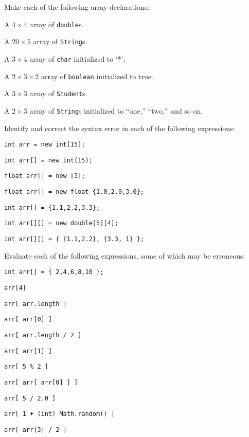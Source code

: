 \begin{EXRtwo}
\baselineskip=11pt\item  Make each of the following array declarations:
\begin{EXRtwoLL}
\item  A $4 \times 4$ array of {\tt double}s.
\item  A $20 \times 5$ array of {\tt String}s.
\item  A $3 \times 4$ array of {\tt char} initialized to `*';
\item  A $2 \times 3 \times 2$ array of {\tt boolean} initialized to true.
\item  A $3 \times 3$  array of {\tt Student}s.
\item  A $2 \times 3$  array of {\tt String}s initialized to ``one,'' ``two,''
and so on.
\end{EXRtwoLL}

\item Identify and correct the syntax error in
each of the following expressions:
\begin{EXRtwoLL}
\item  \verb|int arr = new int[15];|
\item  \verb|int arr[] = new int(15);|
\item  \verb|float arr[] = new [3];|
\item  \verb|float arr[] = new float {1.0,2.0,3.0};|
\item  \verb|int arr[] = {1.1,2.2,3.3};|
\item  \verb|int arr[][] = new double[5][4];|
\item  \verb|int arr[][] = { {1.1,2.2}, {3.3, 1} };|
\end{EXRtwoLL}


\item  Evaluate each of the following expressions, some
of which may be erroneous:
\begin{jjjlisting}
\begin{lstlisting}
int arr[] = { 2,4,6,8,10 };
\end{lstlisting}
\end{jjjlisting}
\begin{EXRtwoLL}
\begin{multicols}{2}
\item  \verb|arr[4]|
\item  \verb|arr[ arr.length ]|
\item  \verb|arr[ arr[0] ]|
\item  \verb|arr[ arr.length / 2 ]|
\item  \verb|arr[ arr[1] ]|
\item  \verb|arr[ 5 % 2 ]|
\item  \verb|arr[ arr[ arr[0] ] ]|
\item  \verb|arr[ 5 / 2.0 ]|
\item  \verb|arr[ 1 + (int) Math.random() ]|
\item  \verb|arr[ arr[3] / 2 ]|
\end{multicols}
\end{EXRtwoLL}


\end{EXRtwo}
